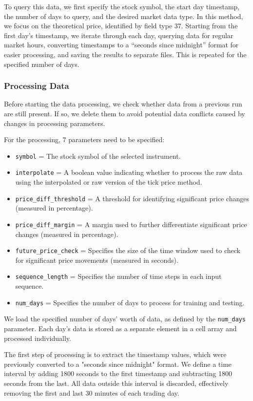 \documentclass[a4paper,oneside,onecolumn,12pt]{book}
\begin{document}
		To query this data, we first specify the stock symbol, the start day timestamp, the number of days to query, and the desired market data type. In this method, we focus on the theoretical price, identified by field type 37. Starting from the first day's timestamp, we iterate through each day, querying data for regular market hours, converting timestamps to a “seconds since midnight” format for easier processing, and saving the results to separate files. This is repeated for the specified number of days.

		\subsubsection{Processing Data}
		Before starting the data processing, we check whether data from a previous run are still present. If so, we delete them to avoid potential data conflicts caused by changes in processing parameters.
		
		For the processing, 7 parameters need to be specified:
		\begin{itemize}
			\item \texttt{symbol} = The stock symbol of the selected instrument.
			\item \texttt{interpolate} = A boolean value indicating whether to process the raw data using the interpolated or raw version of the tick price method.
			\item \texttt{price\_diff\_threshold} = A threshold for identifying significant price changes (measured in percentage).
			\item \texttt{price\_diff\_margin} = A margin used to further differentiate significant price changes (measured in percentage).
			\item \texttt{future\_price\_check} = Specifies the size of the time window used to check for significant price movements (measured in seconds).
			\item \texttt{sequence\_length} = Specifies the number of time steps in each input sequence.
			\item \texttt{num\_days} = Specifies the number of days to process for training and testing.
		\end{itemize}

		We load the specified number of days' worth of data, as defined by the \texttt{num\_days} parameter. Each day's data is stored as a separate element in a cell array and processed individually.

		The first step of processing is to extract the timestamp values, which were previously converted to a "seconds since midnight" format. We define a time interval by adding 1800 seconds to the first timestamp and subtracting 1800 seconds from the last. All data outside this interval is discarded, effectively removing the first and last 30 minutes of each trading day.
		
\end{document}
